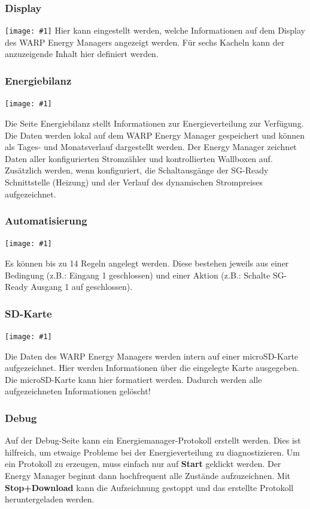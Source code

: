 \documentclass[a4paper,10pt]{article}
\newcommand{\gfx}[1]{\texttt{[image: \#1]}}
\begin{document}
\begin{multicols*}{2}
    \subsubsection{Display}
    \gfx{./img_v2/wem2-web-display}
    Hier kann eingestellt werden, welche Informationen auf dem Display des WARP Energy Managers angezeigt werden. Für sechs Kacheln kann der anzuzeigende Inhalt hier definiert werden.
    
	

	\subsubsection{Energiebilanz}

	\gfx{./img_v2/wem2-web-energyanalysis}
	\vspace{-0.2cm}

	Die Seite Energiebilanz stellt Informationen zur Energieverteilung zur Verfügung.
	Die Daten werden lokal auf dem WARP Energy Manager gespeichert und
	können als Tages- und Monatsverlauf dargestellt werden.
	Der Energy Manager zeichnet Daten aller konfigurierten Stromzähler und kontrollierten Wallboxen auf. Zusätzlich werden, wenn konfiguriert,
    die Schaltausgänge der SG-Ready Schnittstelle (Heizung) und der Verlauf des dynamischen Strompreises aufgezeichnet.

    \subsubsection{Automatisierung}
    
    \gfx{./img_v2/wem2-web-automation}
    
    Es können bis zu 14 Regeln angelegt werden. Diese bestehen jeweils aus einer Bedingung (z.B.: \glqq Eingang 1 geschlossen\grqq) 
    und einer Aktion (z.B.: \glqq Schalte SG-Ready Ausgang 1 auf geschlossen\grqq).
    
    
    \subsubsection{SD-Karte}
    
    \gfx{./img/resized/web_em_sdcard}
    
    Die Daten des WARP Energy Managers werden intern auf einer microSD-Karte
	aufgezeichnet. Hier werden Informationen über die eingelegte Karte ausgegeben. Die microSD-Karte kann
	hier formatiert werden. Dadurch werden alle aufgezeichneten Informationen gelöscht!
    
	\subsubsection{Debug}
	Auf der Debug-Seite kann ein Energiemanager-Protokoll erstellt werden. Dies
	ist hilfreich, um etwaige Probleme bei der Energieverteilung zu diagnostizieren. Um
	ein Protokoll zu erzeugen, muss einfach nur auf \textbf{Start} geklickt
	werden. Der Energy Manager beginnt dann hochfrequent alle Zustände
	aufzuzeichnen. Mit \textbf{Stop+Download} kann die Aufzeichnung gestoppt und
	das erstellte Protokoll heruntergeladen werden.


\end{multicols*}
\end{document}
